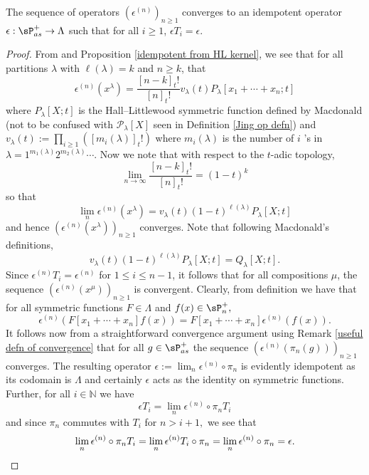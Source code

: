 \begin{prop}\label{idempotents converge}
    The sequence of operators $(\epsilon^{(n)})_{n\geq 1}$ converges to an idempotent operator $\epsilon: \sP_{as}^{+} \rightarrow \Lambda$ such that for all $i \geq 1$, $\epsilon T_i = \epsilon$.
\end{prop}
\begin{proof}
    From \cite[Chapter 3, Section 2, (2.1), page 208]{Macdonald} and Proposition \ref{idempotent from HL kernel}, we see that for all partitions $\lambda$ with $\ell(\lambda) = k$ and $n \geq k$, that 
    \begin{equation}
        \epsilon^{(n)}(x^{\lambda}) = \frac{[n-k]_{t}!}{[n]_{t}!} v_{\lambda}(t) P_{\lambda}[x_1+\cdots + x_n;t]
    \end{equation}
where $P_{\lambda}[X;t]$ is the Hall--Littlewood symmetric function defined by Macdonald (not to be confused with $\mathcal{P}_{\lambda}[X]$ seen in Definition \ref{Jing op defn}) and 
$v_{\lambda}(t) := \prod_{i \geq 1}([m_i(\lambda)]_{t}!)$ where $m_i(\lambda)$ is the number of $i$
's in $\lambda = 1^{m_1(\lambda)}2^{m_2(\lambda)}\cdots$. Now we note that with respect to the $t$-adic topology,
$$\lim_{n \rightarrow \infty} \frac{[n-k]_{t}!}{[n]_{t}!} = (1-t)^k$$ so that 
$$ \lim_{n} \epsilon^{(n)}(x^{\lambda}) = v_{\lambda}(t)(1-t)^{\ell(\lambda)}P_{\lambda}[X;t] $$
and hence $(\epsilon^{(n)}(x^{\lambda}))_{n \geq 1}$ converges.
Note that following Macdonald's definitions, 
$$v_{\lambda}(t)(1-t)^{\ell(\lambda)}P_{\lambda}[X;t] = Q_{\lambda}[X;t].$$
Since $\epsilon^{(n)}T_i = \epsilon^{(n)}$ for $1\leq i \leq n-1$, it follows that for all compositions $\mu$, the sequence $(\epsilon^{(n)}(x^{\mu}))_{n \geq 1}$ is convergent. Clearly, from definition we have that for all symmetric functions $F \in \Lambda$ and $f(x) \in \sP_n^{+},$
$$\epsilon^{(n)}(F[x_1+ \cdots + x_n]f(x)) = F[x_1+ \cdots + x_n] \epsilon^{(n)}(f(x)).$$ It follows now from a straightforward convergence argument using Remark \ref{useful defn of convergence} that for all $g \in \sP_{as}^{+}$ the sequence $(\epsilon^{(n)}(\pi_n(g)))_{n\geq 1}$ converges. The resulting operator $\epsilon:= \lim_{n} \epsilon^{(n)}\circ \pi_n$ is evidently idempotent as its codomain is $\Lambda$ and certainly $\epsilon$ acts as the identity on symmetric functions. Further, for all $i \in \mathbb{N}$ we have  
$$ \epsilon T_i = \lim_{n} \epsilon^{(n)}\circ \pi_n T_i $$
and since $\pi_n$ commutes with $T_i$ for $n > i + 1,$ we see that 
\[\lim_{n} \epsilon^{(n)}\circ \pi_n T_i = \lim_{n} \epsilon^{(n)} T_i \circ \pi_n = \lim_{n} \epsilon^{(n)} \circ \pi_n  = \epsilon. \qedhere\]
\end{proof}

